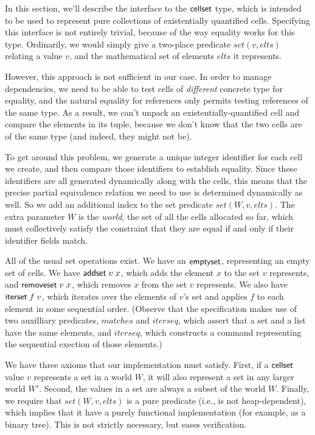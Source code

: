 \documentclass[preprint,natbib]{sigplanconf}
\begin{document}
In this section, we'll describe the interface to the $\mbox{\textsf{{cellset}}}$ type,
which is intended to be used to represent pure collections of
existentially quantified cells. Specifying this interface is not
entirely trivial, because of the way equality works for this
type. Ordinarily, we would simply give a two-place predicate $set(v,
elts)$ relating a value $v$, and the mathematical set of elements
$elts$ it represents.

However, this approach is not sufficient in our case. In order to
manage dependencies, we need to be able to test cells of
\emph{different} concrete type for equality, and the natural equality
for references only permits testing references of the same type. As a
result, we can't unpack an existentially-quantified cell and compare
the elements in its tuple, because we don't know that the two cells
are of the same type (and indeed, they might not be). 

To get around this problem, we generate a unique integer identifier
for each cell we create, and then compare those identifiers to
establish equality. Since these identifiers are all generated
dynamically along with the cells, this means that the precise partial
equivalence relation we need to use is determined dynamically as
well. So we add an additional index to the set predicate $set(W, v,
elts)$. The extra parameter $W$ is the \emph{world}, the set of all
the cells allocated so far, which must collectively satisfy the
constraint that they are equal if and only if their identifier fields
match. 

All of the usual set operations exist. We have an $\mbox{\textsf{{emptyset}}}$,
representing an empty set of cells. We have $\mbox{\textsf{{addset}}}\;v\;x$,
which adds the element $x$ to the set $v$ represents, and
$\mbox{\textsf{{removeset}}}\;v\;x$, which removes $x$ from the set $v$
represents. We also have $\mbox{\textsf{{iterset}}}\;f\;v$, which iterates over
the elements of $v$'s set and applies $f$ to each element in some
sequential order. (Observe that the specification makes use of two 
auxilliary predicates, $matches$ and $iterseq$, which assert that a
set and a list have the same elements, and $iterseq$, which constructs
a command representing the sequential exection of those elements.) 

We have three axioms that our implementation must satisfy. First, if a
$\mbox{\textsf{{cellset}}}$ value $v$ represents a set in a world $W$, it will also
represent a set in any larger world $W'$. Second, the values in a set
are always a subset of the world $W$. Finally, we require that
$set(W,v,elts)$ is a pure predicate (i.e., is not heap-dependent),
which implies that it have a purely functional implementation (for
example, as a binary tree). This is not strictly necessary, but eases
verification. 
\end{document}
